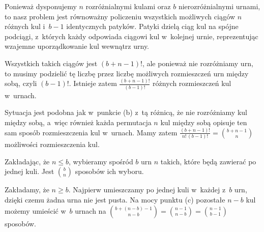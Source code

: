 \subproblem %
Ponieważ dysponujemy $n$ rozróżnialnymi kulami oraz $b$ nierozróżnialnymi urnami, to nasz problem jest równoważny policzeniu wszystkich możliwych ciągów $n$ różnych kul i~$b-1$ identycznych patyków.
Patyki dzielą ciąg kul na spójne podciągi, z~których każdy odpowiada ciągowi kul w~kolejnej urnie, reprezentując wzajemne uporządkowanie kul wewnątrz urny.

Wszystkich takich ciągów jest $(b+n-1)!$, ale ponieważ nie rozróżniamy urn, to musimy podzielić tę liczbę przez liczbę możliwych rozmieszczeń urn między sobą, czyli $(b-1)!$.
Istnieje zatem $\frac{(b+n-1)!}{(b-1)!}$ różnych rozmieszczeń kul w~urnach.

\subproblem %
Sytuacja jest podobna jak w~punkcie (b) z~tą różnicą, że nie rozróżniamy kul między sobą, a~więc również każda permutacja $n$ kul między sobą opisuje ten sam sposób rozmieszczenia kul w~urnach.
Mamy zatem $\frac{(b+n-1)!}{n!\,(b-1)!}=\binom{b+n-1}{n}$ możliwości rozmieszczenia kul.

\subproblem %
Zakładając, że $n\le b$, wybieramy spośród $b$ urn $n$ takich, które będą zawierać po jednej kuli.
Jest $\binom{b}{n}$ sposobów ich wyboru.

\subproblem %
Zakładamy, że $n\ge b$.
Najpierw umieszczamy po jednej kuli w~każdej z~$b$ urn, dzięki czemu żadna urna nie jest pusta.
Na mocy punktu (c) pozostałe $n-b$ kul możemy umieścić w~$b$ urnach na $\binom{b+(n-b)-1}{n-b}=\binom{n-1}{n-b}=\binom{n-1}{b-1}$ sposobów.

\endinput
